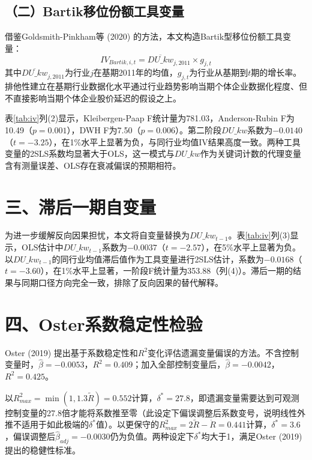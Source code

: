\documentclass[11pt,a4paper]{article}
\begin{document}
\subsection*{（二）Bartik移位份额工具变量}

借鉴Goldsmith-Pinkham等 (2020) 的方法，本文构造Bartik型移位份额工具变量：
\begin{equation}
IV_{Bartik,i,t} = \overline{DU\_kw}_{j,2011} \times g_{j,t}
\end{equation}
其中$\overline{DU\_kw}_{j,2011}$为行业$j$在基期2011年的均值，$g_{j,t}$为行业从基期到$t$期的增长率。排他性建立在基期行业数据化水平通过行业趋势影响当期个体企业数据化程度、但不直接影响当期个体企业股价延迟的假设之上。

表\ref{tab:iv}列(2)显示，Kleibergen-Paap F统计量为781.03，Anderson-Rubin F为10.49（$p=0.001$），DWH F为7.50（$p=0.006$）。第二阶段$DU\_kw$系数为$-0.0140$（$t=-3.25$），在1\%水平上显著为负，与同行业均值IV结果高度一致。两种工具变量的2SLS系数均显著大于OLS，这一模式与$DU\_kw$作为关键词计数的代理变量含有测量误差、OLS存在衰减偏误的预期相符。

\section*{三、滞后一期自变量}

为进一步缓解反向因果担忧，本文将自变量替换为$DU\_kw_{t-1}$。表\ref{tab:iv}列(3)显示，OLS估计中$DU\_kw_{t-1}$系数为$-0.0037$（$t=-2.57$），在5\%水平上显著为负。以$DU\_kw_{t-1}$的同行业均值滞后值作为工具变量进行2SLS估计，系数为$-0.0168$（$t=-3.60$），在1\%水平上显著，一阶段F统计量为353.88（列(4)）。滞后一期的结果与同期口径方向完全一致，排除了反向因果的替代解释。

\section*{四、Oster系数稳定性检验}

Oster (2019) 提出基于系数稳定性和$R^2$变化评估遗漏变量偏误的方法。不含控制变量时，$\hat{\beta}=-0.0053$，$R^2=0.409$；加入全部控制变量后，$\hat{\beta}=-0.0042$，$R^2=0.425$。

以$R^2_{max}=\min(1, 1.3\tilde{R})=0.552$计算，$\delta^*=27.8$，即遗漏变量需要达到可观测控制变量的27.8倍才能将系数推至零（此设定下偏误调整后系数变号，说明线性外推不适用于如此极端的$\delta^*$值）。以更保守的$R^2_{max}=2\tilde{R}-\dot{R}=0.441$计算，$\delta^*=3.6$，偏误调整后$\hat{\beta}_{adj}=-0.0030$仍为负值。两种设定下$\delta^*$均大于1，满足Oster (2019) 提出的稳健性标准。
\end{document}
